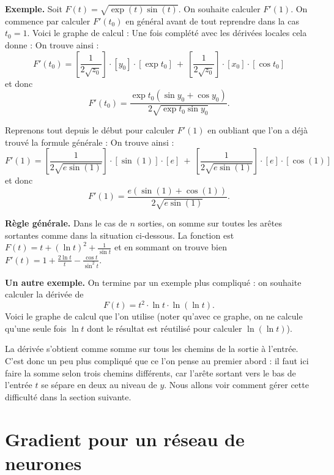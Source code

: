 \documentclass[11pt,class=report,crop=false]{standalone}
\begin{document}
\bigskip
\textbf{Exemple.}
Soit $F(t) = \sqrt{\exp(t)\sin(t)}$. On souhaite calculer $F'(1)$. On commence par calculer $F'(t_0)$ en général avant de tout reprendre dans la cas $t_0=1$.
Voici le graphe de calcul :
Une fois complété avec les dérivées locales cela donne :
On trouve ainsi :
$$F'(t_0) = \left[\frac{1}{2\sqrt{z_0}}\right]\cdot[y_0]\cdot[\exp t_0]
\  + \  \left[\frac{1}{2\sqrt{z_0}}\right]\cdot[x_0]\cdot[\cos t_0]
$$
et donc 
$$F'(t_0) = \frac{\exp t_0 (\sin y_0 + \cos y_0)}{2\sqrt{\exp t_0 \sin y_0}}.$$

Reprenons tout depuis le début pour calculer $F'(1)$ en oubliant que l'on a déjà trouvé la formule générale :
On trouve ainsi :
$$F'(1) = \left[\frac{1}{2\sqrt{e\sin(1)}}\right]\cdot[\sin(1)]\cdot[e]
\  + \  \left[\frac{1}{2\sqrt{e\sin(1)}}\right]\cdot[e]\cdot[\cos(1)]
$$
et donc 
$$F'(1) = \frac{e (\sin(1)+\cos(1))}{2\sqrt{e\sin(1)}}.$$


\bigskip
\textbf{Règle générale.}
Dans le cas de $n$ sorties, on somme sur toutes les arêtes sortantes comme dans la situation ci-dessous.
La fonction est $F(t) = t + (\ln t)^2 + \frac{1}{\sin t}$ et en sommant on trouve bien $F'(t) = 1 + \frac{2\ln t}{t} - \frac{\cos t}{\sin^2 t}$.


\bigskip
\textbf{Un autre exemple.}
On termine par un exemple plus compliqué : on souhaite calculer la dérivée de 
$$F(t) = t^2 \cdot \ln t \cdot \ln(\ln t).$$
Voici le graphe de calcul que l'on utilise (noter qu'avec ce graphe, on ne calcule qu'une seule fois $\ln t$ dont le résultat est réutilisé pour calculer $\ln(\ln t)$).


La dérivée s'obtient comme somme sur tous les chemins de la sortie à l'entrée.
C'est donc un peu plus compliqué que ce l'on pense au premier abord : il faut ici faire la somme selon trois chemins différents, car l'arête sortant vers le bas de l'entrée $t$ se sépare en deux au niveau de $y$. Nous allons voir comment gérer cette difficulté dans la section suivante.


\section{Gradient pour un réseau de neurones}
\end{document}
